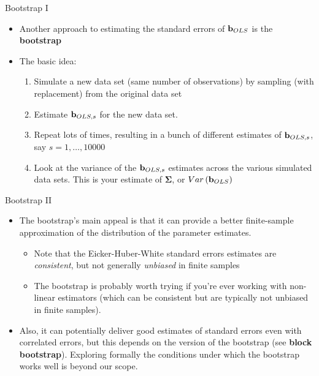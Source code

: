 



\begin{frame}{Bootstrap I}
\begin{itemize}
	\item Another approach to estimating the standard errors of ${\bf b}_{OLS}$
	is the {\bf bootstrap}

	\item The basic idea:
	\begin{enumerate}
		\item Simulate a new data set (same number of observations) by sampling (with replacement) from the original data set

		\item Estimate ${\bf b}_{OLS,s}$ for the new data set.

		\item Repeat lots of times, resulting in a bunch of different estimates of ${\bf b}_{OLS,s}$, say $s=1,\dots,10000$

		\item Look at the variance of the ${\bf b}_{OLS,s}$ estimates 
		across the various simulated data sets. This is your estimate of $\boldsymbol{\Sigma}$, or $Var\left({\bf b}_{OLS}\right)$
	\end{enumerate}

\end{itemize}
\end{frame}


\begin{frame}{Bootstrap II}
\begin{itemize}
	\item The bootstrap's main appeal is that it can provide a better finite-sample
	approximation of the distribution of the parameter estimates.
	\begin{itemize}
		\item Note that the Eicker-Huber-White standard errors estimates are \emph{consistent}, but
		not generally \emph{unbiased} in finite samples
		\item The bootstrap is probably worth trying if you're ever working with
		 non-linear estimators (which can be consistent but are typically not unbiased in finite samples). 
	\end{itemize}

	\medskip
	\item Also, it can potentially deliver good estimates of standard errors even with 
	correlated errors, but this depends on the version of the bootstrap (see {\bf block bootstrap}).
	 Exploring formally the  conditions under which the bootstrap works well is beyond our scope. 
\end{itemize}
\end{frame}




